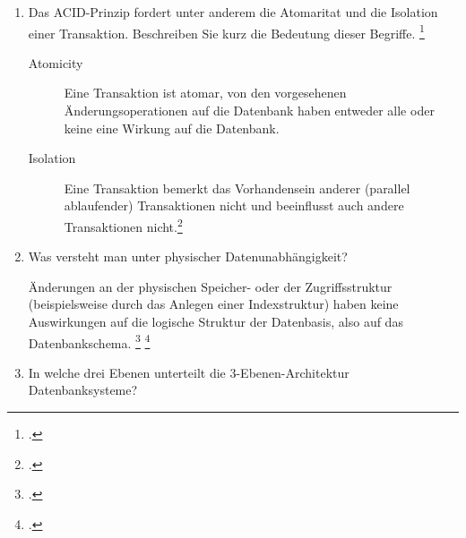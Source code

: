 \documentclass{bschlangaul-aufgabe}
\begin{document}

\let\m=\bAttributMenge
\let\fa=\bFunktionaleAbhaengigkeit

\begin{enumerate}


\item Das ACID-Prinzip fordert unter anderem die Atomaritat und die
Isolation einer Transaktion. Beschreiben Sie kurz die Bedeutung dieser
Begriffe.
\footcite{examen:66116:2019:03}

\begin{bAntwort}
\begin{description}
\item[Atomicity]

Eine Transaktion ist atomar, \dh von den vorgesehenen
Änderungsoperationen auf die Datenbank haben entweder alle oder keine
eine Wirkung auf die Datenbank.

\item[Isolation]

Eine Transaktion bemerkt das Vorhandensein anderer (parallel
ablaufender) Transaktionen nicht und beeinflusst auch andere
Transaktionen nicht.\footcite[Kapitel 9.5 „Eigenschaften von Transaktionen“, Seite 305]{kemper}
\end{description}
\end{bAntwort}


\item Was versteht man unter physischer Datenunabhängigkeit?

\begin{bAntwort}
Änderungen an der physischen Speicher- oder der Zugriffsstruktur
(beispielsweise durch das Anlegen einer Indexstruktur) haben keine
Auswirkungen auf die logische Struktur der Datenbasis, also auf das
Datenbankschema.
\footcite[Seite 20]{db:fs:3}
\footcite[Kapitel 1.3 Datenunabhängigkeit Seite 24]{kemper}
\end{bAntwort}


\item In welche drei Ebenen unterteilt die 3-Ebenen-Architektur
Datenbanksysteme?


\end{enumerate}
\end{document}
